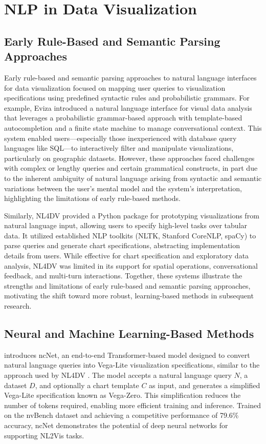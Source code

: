 \section{NLP in Data Visualization}

\subsection{Early Rule-Based and Semantic Parsing Approaches}

Early rule-based and semantic parsing approaches to natural language interfaces for data visualization focused on mapping user queries to visualization specifications using predefined syntactic rules and probabilistic grammars. For example, Eviza \cite{Setlur2016Eviza} introduced a natural language interface for visual data analysis that leverages a probabilistic grammar-based approach with template-based autocompletion and a finite state machine to manage conversational context. This system enabled users—especially those inexperienced with database query languages like SQL—to interactively filter and manipulate visualizations, particularly on geographic datasets. However, these approaches faced challenges with complex or lengthy queries and certain grammatical constructs, in part due to the inherent ambiguity of natural language arising from syntactic and semantic variations between the user's mental model and the system's interpretation, highlighting the limitations of early rule-based methods.

Similarly, NL4DV \cite{Narechania2021NL4DV} provided a Python package for prototyping visualizations from natural language input, allowing users to specify high-level tasks over tabular data. It utilized established NLP toolkits (NLTK, Stanford CoreNLP, spaCy) to parse queries and generate chart specifications, abstracting implementation details from users. While effective for chart specification and exploratory data analysis, NL4DV was limited in its support for spatial operations, conversational feedback, and multi-turn interactions. Together, these systems illustrate the strengths and limitations of early rule-based and semantic parsing approaches, motivating the shift toward more robust, learning-based methods in subsequent research.

\subsection{Neural and Machine Learning-Based Methods}

\cite{Luo2022NL2Vis} introduces ncNet, an end-to-end Transformer-based model designed to convert natural language queries into Vega-Lite visualization specifications, similar to the approach used by NL4DV \cite{Narechania2021NL4DV}. The model accepts a natural language query $N$, a dataset $D$, and optionally a chart template $C$ as input, and generates a simplified Vega-Lite specification known as Vega-Zero. This simplification reduces the number of tokens required, enabling more efficient training and inference. Trained on the nvBench dataset and achieving a competitive performance of 79.6\% accuracy, ncNet demonstrates the potential of deep neural networks for supporting NL2Vis tasks.


